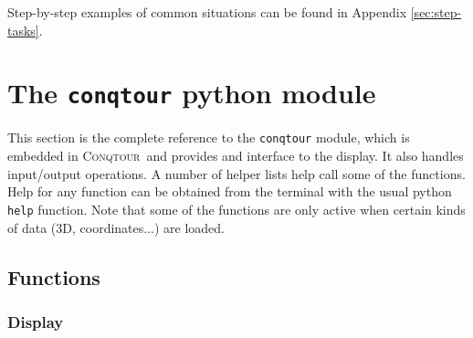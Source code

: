 \documentclass[a4paper,notitlepage,11pt]{article}
\def\Conqtour{\textsc{Conqtour}}
\begin{document}
Step-by-step examples of common situations can be found in Appendix
\ref{sec:step-tasks}.

\pagebreak



\appendix
\pagestyle{appendix}

\section{The \texttt{conqtour} python module}
\label{sec:py-module}

This section is the complete reference to the \texttt{conqtour} module, which is embedded
in \Conqtour\ and provides and interface to the display. It also handles input/output 
operations. A number of helper lists help call some of the functions. Help for any 
function can be obtained from the terminal with the usual python \texttt{help} function.
Note that some of the functions are only active when certain kinds of data (3D, coordinates...)
are loaded.

\subsection{Functions}
\label{sec:py-functions}

\subsubsection{Display}
\label{sec:py-functions-display}

\end{document}
